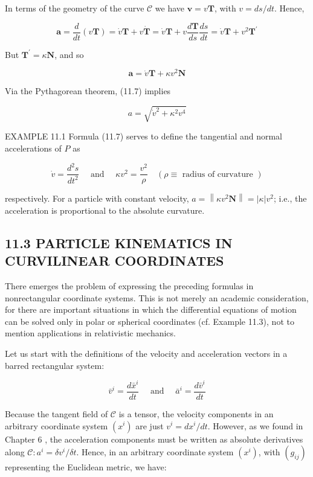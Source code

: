 \documentclass[10pt]{article}
\begin{document}
In terms of the geometry of the curve $\mathscr{C}$ we have $\mathbf{v}=v \mathbf{T}$, with $v=d s / d t$. Hence,

$$
\mathbf{a}=\frac{d}{d t}(v \mathbf{T})=\dot{v} \mathbf{T}+v \dot{\mathbf{T}}=\dot{v} \mathbf{T}+v \frac{d \mathbf{T}}{d s} \frac{d s}{d t}=\dot{v} \mathbf{T}+v^{2} \mathbf{T}^{\prime}
$$

But $\mathbf{T}^{\prime}=\kappa \mathbf{N}$, and so


\begin{equation*}
\mathbf{a}=\dot{v} \mathbf{T}+\kappa v^{2} \mathbf{N} \tag{11.7}
\end{equation*}


Via the Pythagorean theorem, (11.7) implies


\begin{equation*}
a=\sqrt{\dot{v}^{2}+\kappa^{2} v^{4}} \tag{11.8}
\end{equation*}


EXAMPLE 11.1 Formula (11.7) serves to define the tangential and normal accelerations of $P$ as

$$
\dot{v}=\frac{d^{2} s}{d t^{2}} \quad \text { and } \quad \kappa v^{2}=\frac{v^{2}}{\rho} \quad(\rho \equiv \text { radius of curvature })
$$

respectively. For a particle with constant velocity, $a=\left\|\kappa v^{2} \mathbf{N}\right\|=|\kappa| v^{2}$; i.e., the acceleration is proportional to the absolute curvature.

\subsection*{11.3 PARTICLE KINEMATICS IN CURVILINEAR COORDINATES}
There emerges the problem of expressing the preceding formulas in nonrectangular coordinate systems. This is not merely an academic consideration, for there are important situations in which the differential equations of motion can be solved only in polar or spherical coordinates (cf. Example 11.3), not to mention applications in relativistic mechanics.

Let us start with the definitions of the velocity and acceleration vectors in a barred rectangular system:

$$
\bar{v}^{i}=\frac{d \bar{x}^{i}}{d t} \quad \text { and } \quad \bar{a}^{i}=\frac{d \bar{v}^{i}}{d t}
$$

Because the tangent field of $\mathscr{C}$ is a tensor, the velocity components in an arbitrary coordinate system $\left(x^{i}\right)$ are just $v^{i}=d x^{i} / d t$. However, as we found in Chapter 6 , the acceleration components must be written as absolute derivatives along $\mathscr{C}: a^{i}=\delta v^{i} / \delta t$. Hence, in an arbitrary coordinate system $\left(x^{i}\right)$, with $\left(g_{i j}\right)$ representing the Euclidean metric, we have:
\end{document}
